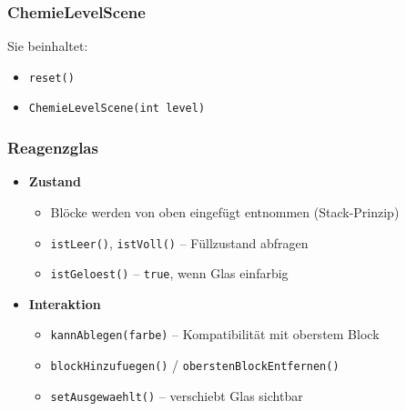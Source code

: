 \begin{frame}
\frametitle{ChemieLevelScene}

Sie beinhaltet:
	\begin{itemize}
		\item \texttt{reset()}
		\item \texttt{ChemieLevelScene(int level)}
	\end{itemize}
\end{frame}

\begin{frame}
    \frametitle{Reagenzglas}

    \begin{itemize}
        \item \textbf{Zustand}
        \begin{itemize}
            \item Blöcke werden von oben eingefügt entnommen (Stack-Prinzip)
            \item \texttt{istLeer()}, \texttt{istVoll()} – Füllzustand abfragen
            \item \texttt{istGeloest()} – \texttt{true}, wenn Glas einfarbig
        \end{itemize} \pause

        \item \textbf{Interaktion}
        \begin{itemize}
            \item \texttt{kannAblegen(farbe)} – Kompatibilität mit oberstem Block
            \item \texttt{blockHinzufuegen()} / \texttt{oberstenBlockEntfernen()}
            \item \texttt{setAusgewaehlt()} – verschiebt Glas sichtbar
        \end{itemize}
    \end{itemize}
\end{frame}

